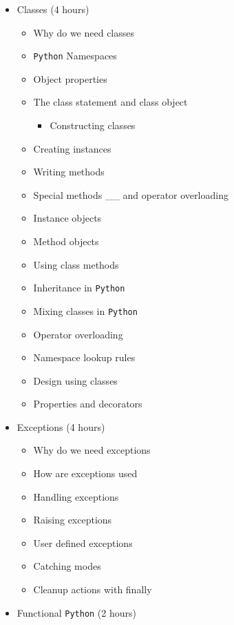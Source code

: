 \documentclass[
]{article}
\providecommand{\tightlist}{%
  \setlength{\itemsep}{0pt}\setlength{\parskip}{0pt}}
\begin{document}
\begin{itemize}
  \begin{itemize}
  \tightlist
  \item
    Why do we need modules
  \item
    Namespaces
  \item
    The various ways of importing other modules
  \item
    Reloading modules
  \item
    Module search path
  \item
    Compiling modules
  \item
    The standard library of modules and it's documentation
  \item
    The dir function
  \end{itemize}
\item
  Classes (4 hours)

  \begin{itemize}
  \tightlist
  \item
    Why do we need classes
  \item
    \texttt{Python} Namespaces
  \item
    Object properties
  \item
    The class statement and class object

    \begin{itemize}
    \tightlist
    \item
      Constructing classes
    \end{itemize}
  \item
    Creating instances
  \item
    Writing methods
  \item
    Special methods \_\_ and operator overloading
  \item
    Instance objects
  \item
    Method objects
  \item
    Using class methods
  \item
    Inheritance in \texttt{Python}
  \item
    Mixing classes in \texttt{Python}
  \item
    Operator overloading
  \item
    Namespace lookup rules
  \item
    Design using classes
  \item
    Properties and decorators
  \end{itemize}
\item
  Exceptions (4 hours)

  \begin{itemize}
  \tightlist
  \item
    Why do we need exceptions
  \item
    How are exceptions used
  \item
    Handling exceptions
  \item
    Raising exceptions
  \item
    User defined exceptions
  \item
    Catching modes
  \item
    Cleanup actions with finally
  \end{itemize}
\item
  Functional \texttt{Python} (2 hours)


\end{itemize}
\end{document}
